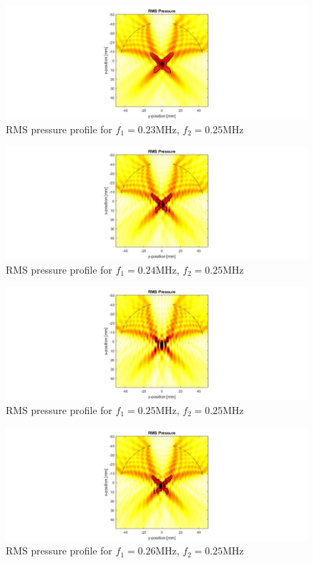 \documentclass[10pt,a4paper]{article}
\begin{document}
\begin{figure}[!h]\label{f230kHz}
\hspace*{-5cm}                                                    
\includegraphics[scale=0.6]{f230kHz}
\caption{RMS pressure profile for $f_1 = 0.23$MHz, $f_2 = 0.25$MHz}
\end{figure}
\begin{figure}[!h]\label{f240kHz}
\hspace*{-5cm}                                                    
\includegraphics[scale=0.6]{f240kHz}
\caption{RMS pressure profile for $f_1 = 0.24$MHz, $f_2 = 0.25$MHz}
\end{figure}
\begin{figure}[!h]\label{f250kHz}
\hspace*{-5cm}                                                    
\includegraphics[scale=0.6]{f250kHz}
\caption{RMS pressure profile for $f_1 = 0.25$MHz, $f_2 = 0.25$MHz}
\end{figure}
\begin{figure}[!h]\label{f260kHz}
\hspace*{-5cm}                                                    
\includegraphics[scale=0.6]{f260kHz}
\caption{RMS pressure profile for $f_1 = 0.26$MHz, $f_2 = 0.25$MHz}
\end{figure}
\end{document}

